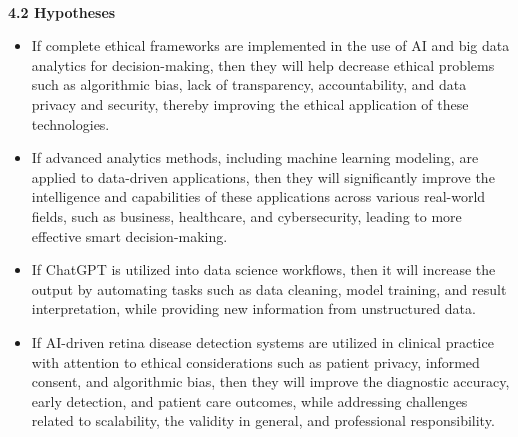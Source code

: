 \documentclass[a4paper, 12pt]{article}
\begin{document}

\textbf{\large \\4.2 \hspace{5mm} Hypotheses}
\begin{itemize}
\item If complete ethical frameworks are implemented in the use of AI and big data analytics for decision-making, then they will help decrease ethical problems such as algorithmic bias, lack of transparency, accountability, and data privacy and security, thereby improving the ethical application of these technologies. 

\item If advanced analytics methods, including machine learning modeling, are applied to data-driven applications, then they will significantly improve the intelligence and capabilities of these applications across various real-world fields, such as business, healthcare, and cybersecurity, leading to more effective smart decision-making. 

\item If ChatGPT is utilized into data science workflows, then it will increase the output by automating tasks such as data cleaning, model training, and result interpretation, while providing new information from unstructured data. 

\item If AI-driven retina disease detection systems are utilized in clinical practice with attention to ethical considerations such as patient privacy, informed consent, and algorithmic bias, then they will improve the diagnostic accuracy, early detection, and patient care outcomes, while addressing challenges related to scalability, the validity in general, and professional responsibility.
\end{itemize}
\pagebreak
\end{document}

